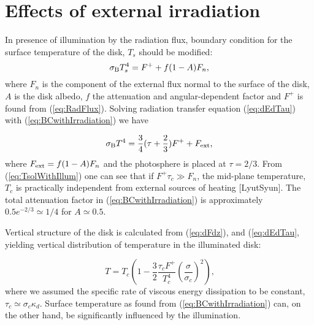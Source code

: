 \documentclass[12pt,english,preprint]{aastex}
\begin{document}

\section{Effects of external irradiation}

In presence of illumination by the radiation flux, boundary condition
for the surface temperature of the disk, $T_{s}$ should be modified:
\begin{equation}
\sigma_{{\rm B}}T_{s}^{4}=F^{+}+f(1-A)F_{n}\mbox{,}\label{eq:BCwithIrradiation}
\end{equation}
where $F_{n}$ is the component of the external flux normal to the
surface of the disk, $A$ is the disk albedo, $f$ the attenuation and angular-dependent
factor and $F^{+}$ is found from (\ref{eq:RadFlux}). Solving radiation
transfer equation (\ref{eq:dEdTau}) with (\ref{eq:BCwithIrradiation})
we have

\begin{equation}
\sigma_{{\rm B}}T^{4}=\frac{3}{4}(\tau+\frac{2}{3})F^{+}+F_{{\rm ext}}\mbox{,}\label{eq:TsolWithIllum}
\end{equation}
where $F_{{\rm ext}}=f(1-A)F_{n}$ and the photosphere is placed at
$\tau=2/3$. From (\ref{eq:TsolWithIllum}) one can see that if $F^{+}\tau_{c}\gg F_{n}$,
the mid-plane temperature, $T_{c}$ is practically independent from
external sources of heating {[}LyutSyun{]}. The total attenuation
factor in (\ref{eq:BCwithIrradiation}) is approximately $0.5e^{-2/3}\simeq1/4$
for $A\simeq0.5$.

Vertical structure of the disk is calculated from (\ref{eq:dFdz}), and
(\eqref{eq:dEdTau}, yielding vertical distribution of temperature
in the illuminated disk:

\begin{equation}
T=T_{c}\left(1-\frac{3}{2}\frac{\tau_{c}F^{+}}{T_{c}^{4}}\left(\frac{\sigma}{\sigma_{c}}\right)^{2}\right)\mbox{,}\label{eq:TcWithIllum}
\end{equation}
where we assumed the specific rate of viscous energy dissipation to
be constant, $\tau_{c}\simeq\sigma_{c}\kappa_{d}$. Surface temperature
as found from (\ref{eq:BCwithIrradiation}) can, on the other hand,
be significantly influenced by the illumination.
\end{document}
